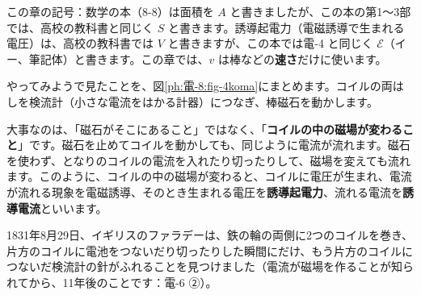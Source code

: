 \noindent この章の記号：数学の本（8-8）は面積を $A$ と書きましたが、この本の第1〜3部では、高校の教科書と同じく $S$ と書きます。誘導起電力（電磁誘導で生まれる電圧）は、高校の教科書では $V$ と書きますが、この本では電-4 と同じく $\mathcal E$（イー、筆記体）と書きます。この章では、$v$ は棒などの\textbf{速さ}だけに使います。



\label{ph:電-8:sec1}
やってみようで見たことを、図\ref{ph:電-8:fig-4koma}にまとめます。コイルの両はしを検流計（小さな電流をはかる計器）につなぎ、棒磁石を動かします。
\begin{bkfigure}
\label{ph:電-8:fig-4koma}
\end{bkfigure}
大事なのは、「磁石がそこにあること」ではなく、「\textbf{コイルの中の磁場が変わること}」です。磁石を止めてコイルを動かしても、同じように電流が流れます。磁石を使わず、となりのコイルの電流を入れたり切ったりして、磁場を変えても流れます。このように、コイルの中の磁場が変わると、コイルに電圧が生まれ、電流が流れる現象を電磁誘導、そのとき生まれる電圧を\textbf{誘導起電力}、流れる電流を\textbf{誘導電流}といいます。

1831年8月29日、イギリスのファラデーは、鉄の輪の両側に2つのコイルを巻き、片方のコイルに電池をつないだり切ったりした瞬間にだけ、もう片方のコイルにつないだ検流計の針がふれることを見つけました（電流が磁場を作ることが知られてから、11年後のことです：電-6 ②）。


